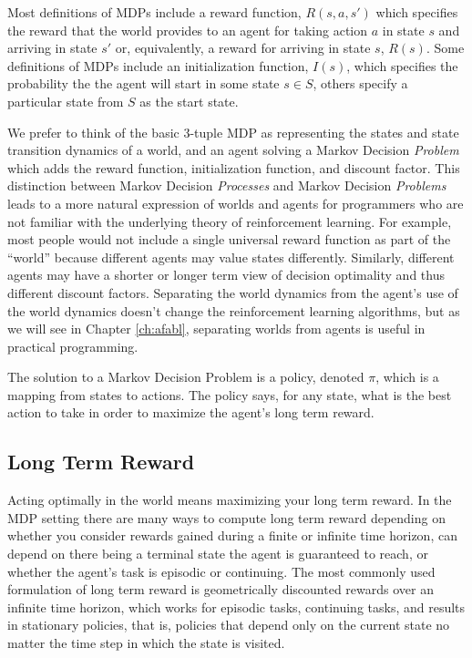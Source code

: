 Most definitions of MDPs include a reward function, $R(s, a, s')$ which specifies the reward that the world provides to an agent for taking action $a$ in state $s$ and arriving in state $s'$ or, equivalently, a reward for arriving in state $s$, $R(s)$. Some definitions of MDPs include an initialization function, $I(s)$, which specifies the probability the the agent will start in some state $s \in S$, others specify a particular state from $S$ as the start state.

We prefer to think of the basic 3-tuple MDP as representing the states and state transition dynamics of a world, and an agent solving a Markov Decision {\it Problem} which adds the reward function, initialization function, and discount factor. This distinction between Markov Decision {\it Processes} and Markov Decision {\it Problems} leads to a more natural expression of worlds and agents for programmers who are not familiar with the underlying theory of reinforcement learning. For example, most people would not include a single universal reward function as part of the ``world'' because different agents may value states differently. Similarly, different agents may have a shorter or longer term view of decision optimality and thus different discount factors. Separating the world dynamics from the agent's use of the world dynamics doesn't change the reinforcement learning algorithms, but as we will see in Chapter \ref{ch:afabl}, separating worlds from agents is useful in practical programming.

The solution to a Markov Decision Problem is a policy, denoted $\pi$, which is a mapping from states to actions. The policy says, for any state, what is the best action to take in order to maximize the agent's long term reward.

\subsection{Long Term Reward}

Acting optimally in the world means maximizing your long term reward. In the MDP setting there are many ways to compute long term reward depending on whether you consider rewards gained during a finite or infinite time horizon, can depend on there being a terminal state the agent is guaranteed to reach, or whether the agent's task is episodic or continuing. The most commonly used formulation of long term reward is geometrically discounted rewards over an infinite time horizon, which works for episodic tasks, continuing tasks, and results in stationary policies, that is, policies that depend only on the current state no matter the time step in which the state is visited.

